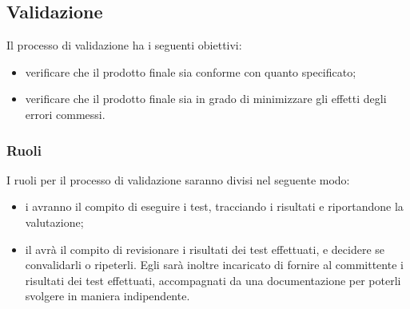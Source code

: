 \subsection{Validazione}
Il processo di validazione ha i seguenti obiettivi:
\begin{itemize}
	\item verificare che il prodotto finale sia conforme con quanto specificato;
	\item verificare che il prodotto finale sia in grado di minimizzare gli effetti degli errori commessi.
\end{itemize}
\subsubsection{Ruoli}
I ruoli per il processo di validazione saranno divisi nel seguente modo:
\begin{itemize}
	\item i \vers{} avranno il compito di eseguire i test, tracciando i risultati e riportandone la valutazione;
	\item il \RdP{} avrà il compito di revisionare i risultati dei test effettuati, e decidere se convalidarli o ripeterli. Egli sarà inoltre incaricato di fornire al committente i risultati dei test effettuati, accompagnati da una documentazione per poterli svolgere in maniera indipendente.
\end{itemize}
